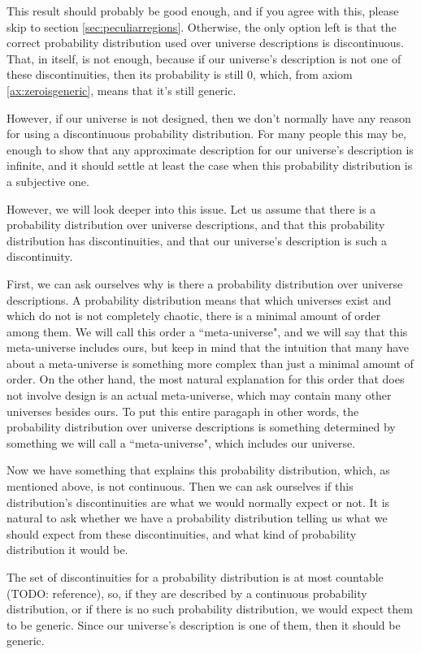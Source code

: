 \documentclass[a4paper
]{article}
\newcommand{\ghilimele}[1]{``#1"}
\begin{document}
This result should probably be good enough, and if you agree with
this, please skip to section \ref{sec:peculiarregions}.
Otherwise, the only option left is that the correct probability
distribution used over universe descriptions is discontinuous.
That, in itself, is not enough, because if our universe's description is not
one of these discontinuities, then its probability is still $0$, which,
from axiom \ref{ax:zeroisgeneric}, means that it's still generic.

However, if our universe is not designed, then we don't normally have any
reason for
using a discontinuous probability distribution.
For many people this may be, enough to
show that any approximate description for our universe's description is
infinite, and it should settle at least the case when this probability
distribution is a subjective one.

However, we will look deeper into this issue.
Let us assume that there is a probability distribution over universe
descriptions, and that this probability distribution has discontinuities,
and that our universe's description is such a discontinuity.

First, we can ask ourselves why is there a probability distribution over
universe descriptions.
A probability distribution means that which universes exist and which do not
is not completely chaotic, there is a minimal amount of order among them.
We will call this order a \ghilimele{meta-universe}, and we will say that
this meta-universe includes ours, but keep in mind that the intuition that
many have about a meta-universe is something more complex than just
a minimal amount of order.
On the other hand, the most natural explanation for this order
that does not involve design is an actual
meta-universe, which may contain many other universes besides ours.
To put this entire paragaph in other words, the probability distribution over
universe descriptions is something determined by something we will call
a \ghilimele{meta-universe}, which includes
our universe.

Now we have something that explains this probability distribution, which,
as mentioned above, is not continuous.
Then we can ask ourselves if this distribution's discontinuities are what
we would normally expect or not.
It is natural to ask whether we have a probability distribution telling us
what we should expect from these discontinuities, and what kind of probability
distribution it would be.

The set of discontinuities for a probability distribution is at most countable
(TODO: reference), so, if they are described by a continuous probability
distribution, or if there is no such probability distribution, we would
expect them to be generic. Since our universe's description is one of them,
then it should be generic.
\end{document}
